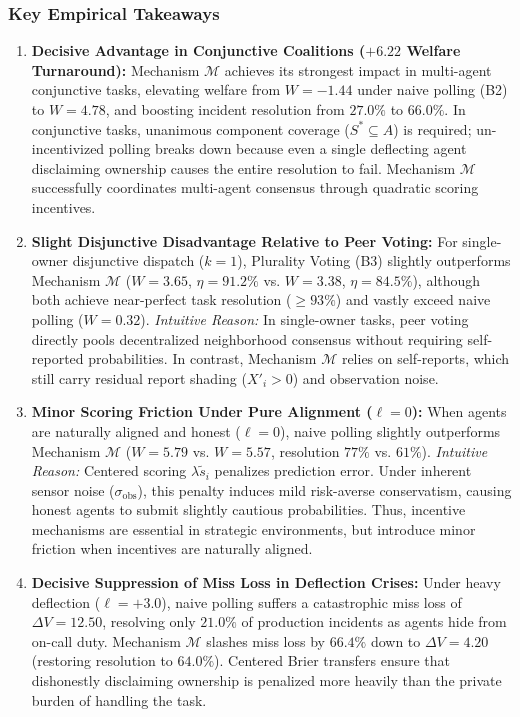 \documentclass{article}
\theoremstyle{definition}
\begin{document}
\subsubsection{Key Empirical Takeaways}
\begin{enumerate}
    \item \textbf{Decisive Advantage in Conjunctive Coalitions ($+6.22$ Welfare Turnaround):} Mechanism $\mathcal{M}$ achieves its strongest impact in multi-agent conjunctive tasks, elevating welfare from $W = -1.44$ under naive polling (B2) to $W = 4.78$, and boosting incident resolution from $27.0\%$ to $66.0\%$. In conjunctive tasks, unanimous component coverage ($S^* \subseteq A$) is required; un-incentivized polling breaks down because even a single deflecting agent disclaiming ownership causes the entire resolution to fail. Mechanism $\mathcal{M}$ successfully coordinates multi-agent consensus through quadratic scoring incentives.
    
    \item \textbf{Slight Disjunctive Disadvantage Relative to Peer Voting:} For single-owner disjunctive dispatch ($k=1$), Plurality Voting (B3) slightly outperforms Mechanism $\mathcal{M}$ ($W = 3.65$, $\eta = 91.2\%$ vs. $W = 3.38$, $\eta = 84.5\%$), although both achieve near-perfect task resolution ($\ge 93\%$) and vastly exceed naive polling ($W = 0.32$).  
    \emph{Intuitive Reason:} In single-owner tasks, peer voting directly pools decentralized neighborhood consensus without requiring self-reported probabilities. In contrast, Mechanism $\mathcal{M}$ relies on self-reports, which still carry residual report shading ($X'_i > 0$) and observation noise.

    \item \textbf{Minor Scoring Friction Under Pure Alignment ($\ell = 0$):} When agents are naturally aligned and honest ($\ell = 0$), naive polling slightly outperforms Mechanism $\mathcal{M}$ ($W = 5.79$ vs. $W = 5.57$, resolution $77\%$ vs. $61\%$).  
    \emph{Intuitive Reason:} Centered scoring $\lambda \tilde{s}_i$ penalizes prediction error. Under inherent sensor noise ($\sigma_{\mathrm{obs}}$), this penalty induces mild risk-averse conservatism, causing honest agents to submit slightly cautious probabilities. Thus, incentive mechanisms are essential in strategic environments, but introduce minor friction when incentives are naturally aligned.

    \item \textbf{Decisive Suppression of Miss Loss in Deflection Crises:} Under heavy deflection ($\ell = +3.0$), naive polling suffers a catastrophic miss loss of $\Delta V = 12.50$, resolving only $21.0\%$ of production incidents as agents hide from on-call duty. Mechanism $\mathcal{M}$ slashes miss loss by $66.4\%$ down to $\Delta V = 4.20$ (restoring resolution to $64.0\%$). Centered Brier transfers ensure that dishonestly disclaiming ownership is penalized more heavily than the private burden of handling the task.


\end{enumerate}
\end{document}
